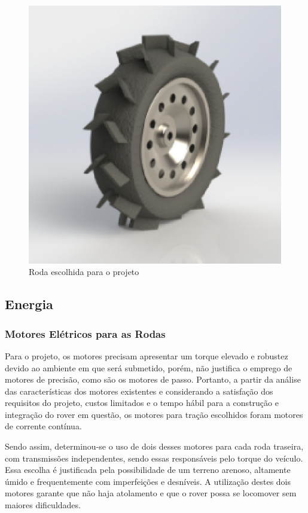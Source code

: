       \begin{figure}[!htbp]
	\centering
	\label{WHEEL}
	  \includegraphics[keepaspectratio=true,scale=0.8]{figuras/wheel.eps}
	\caption{Roda escolhida para o projeto}
      \end{figure}
  
  \subsection{Energia}
  
    \subsubsection{Motores Elétricos para as Rodas}
    
    Para o projeto, os motores precisam apresentar um torque elevado e robustez devido ao ambiente em que será submetido, 
    porém, não justifica o emprego de motores de precisão, como são os motores de passo. Portanto, a partir da análise das 
    características dos motores existentes e considerando a satisfação dos requisitos do projeto, custos limitados e o tempo 
    hábil para a construção e integração do rover em questão, os motores para tração escolhidos foram motores de corrente contínua.
    
    Sendo assim, determinou-se o uso de dois desses motores para cada roda traseira, com transmissões independentes, 
    sendo essas responsáveis pelo torque do veículo. Essa escolha é justificada pela possibilidade de um terreno arenoso, 
    altamente úmido e frequentemente com imperfeições e desníveis.  A utilização destes dois motores garante que não haja 
    atolamento e que o rover possa se locomover sem maiores dificuldades.

